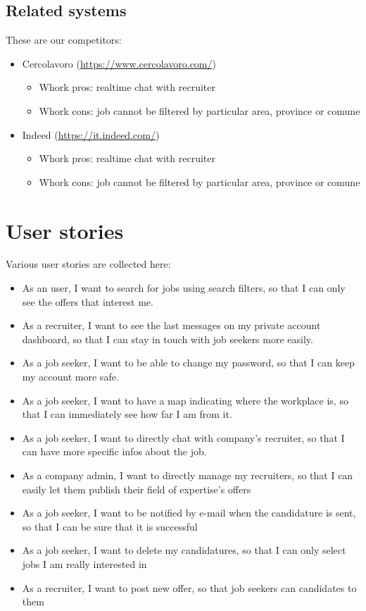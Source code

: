 \documentclass[12pt, a4paper]{article}
\begin{document}
\subsection{Related systems}
These are our competitors:
\begin{itemize}
	\item Cercolavoro (\url{https://www.cercolavoro.com/})
	\begin{itemize}
		\item Whork pros: realtime chat with recruiter
		\item Whork cons: job cannot be filtered by particular area, province or comune
	\end{itemize}
	\item Indeed (\url{https://it.indeed.com/})
	\begin{itemize}
		\item Whork pros: realtime chat with recruiter
		\item Whork cons: job cannot be filtered by particular area, province or comune
	\end{itemize}
\end{itemize}

\section{User stories}
Various user stories are collected here:
\begin{itemize}
	\item As an user, I want to search for jobs using search filters,
		so that I can only see the offers that interest me.
	\item As a recruiter, I want to see the last messages on my private account dashboard, 
		so that I can stay in touch with job seekers more easily.
	\item As a job seeker, I want to be able to change my password, 
		so that I can keep my account more safe.                  
	\item As a job seeker, I want to have a map indicating where the workplace is,
		so that I can immediately see how far I am from it.
	\item As a job seeker, I want to directly chat with company's recruiter,
		so that I can have more specific infos about the job.
	\item As a company admin, I want to directly manage my recruiters,
		so that I can easily let them publish their field of expertise's offers
	\item As a job seeker, I want to be notified by e-mail when the candidature is sent, 
		so that I can be sure that it is successful
	\item As a job seeker, I want to delete my candidatures, 
		so that I can only select jobs I am really interested in
	\item As a recruiter, I want to post new offer, so that job seekers can candidates to them
\end{itemize}
\end{document}
